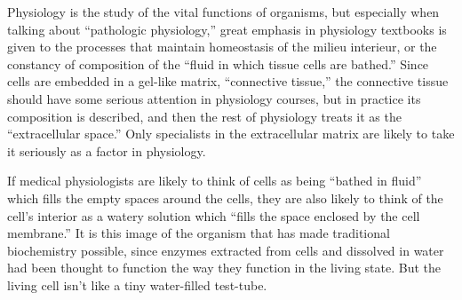 \documentclass{article}
\begin{document}
Physiology is the study of the vital functions of organisms, but especially when talking about “pathologic physiology,” great emphasis in physiology textbooks is given to the processes that maintain homeostasis of the milieu interieur, or the constancy of composition of the “fluid in which tissue cells are bathed.” Since cells are embedded in a gel-like matrix, “connective tissue,” the connective tissue should have some serious attention in physiology courses, but in practice its composition is described, and then the rest of physiology treats it as the “extracellular space.” Only specialists in the extracellular matrix are likely to take it seriously as a factor in physiology.

If medical physiologists are likely to think of cells as being “bathed in fluid” which fills the empty spaces around the cells, they are also likely to think of the cell’s interior as a watery solution which “fills the space enclosed by the cell membrane.” It is this image of the organism that has made traditional biochemistry possible, since enzymes extracted from cells and dissolved in water had been thought to function the way they function in the living state. But the living cell isn’t like a tiny water-filled test-tube.
\end{document}
